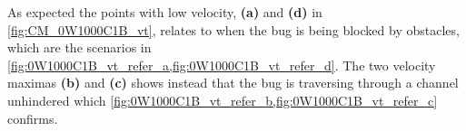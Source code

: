 As expected the points with low velocity, \textbf{(a)} and \textbf{(d)} in 
\cref{fig:CM_0W1000C1B_vt}, relates to when the bug is being blocked by obstacles, which are the scenarios 
in \cref{fig:0W1000C1B_vt_refer_a,fig:0W1000C1B_vt_refer_d}. The 
two velocity maximas \textbf{(b)} and \textbf{(c)} shows instead that the bug is 
traversing through a channel unhindered which \cref{fig:0W1000C1B_vt_refer_b,fig:0W1000C1B_vt_refer_c}
confirms.

